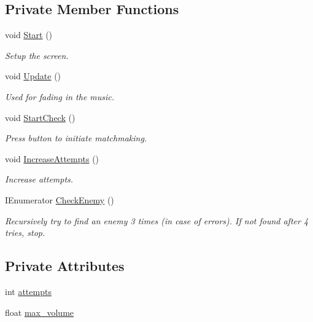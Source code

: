 \subsection*{Private Member Functions}
\begin{DoxyCompactItemize}
\item 
void \mbox{\hyperlink{class_unranked_match_a7361150ca22d5a53cdbfe4d34a6c94ea}{Start}} ()
\begin{DoxyCompactList}\small\item\em Setup the screen. \end{DoxyCompactList}\item 
void \mbox{\hyperlink{class_unranked_match_a11b0733dd14df9f9abcf75dfd7047172}{Update}} ()
\begin{DoxyCompactList}\small\item\em Used for fading in the music. \end{DoxyCompactList}\item 
void \mbox{\hyperlink{class_unranked_match_a39c95f995b2fbaecfc07f24e9ec847a9}{Start\+Check}} ()
\begin{DoxyCompactList}\small\item\em Press button to initiate matchmaking. \end{DoxyCompactList}\item 
void \mbox{\hyperlink{class_unranked_match_a155dc55d0125b9fa9fe2625d976e6278}{Increase\+Attempts}} ()
\begin{DoxyCompactList}\small\item\em Increase attempts. \end{DoxyCompactList}\item 
I\+Enumerator \mbox{\hyperlink{class_unranked_match_ae723d97807f1686b46648b2bbee881ee}{Check\+Enemy}} ()
\begin{DoxyCompactList}\small\item\em Recursively try to find an enemy 3 times (in case of errors). If not found after 4 tries, stop. \end{DoxyCompactList}\end{DoxyCompactItemize}
\subsection*{Private Attributes}
\begin{DoxyCompactItemize}
\item 
int \mbox{\hyperlink{class_unranked_match_a6a0e41bddbea09b48e2129f35875daf2}{attempts}}
\item 
float \mbox{\hyperlink{class_unranked_match_a5aa53fa5b0f4ff0b942fd905beea8c6e}{max\+\_\+volume}}
\end{DoxyCompactItemize}


